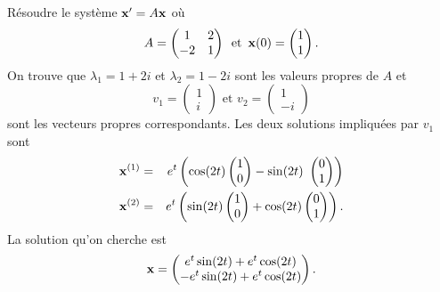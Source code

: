 \begin{example}
  \label{exe:21}
  Résoudre le système $\mathbf{x}' = A\mathbf{x}$ où 
  \begin{displaymath}
    A  =
    \begin{pmatrix}
      1 & 2 \\
      -2 & 1
    \end{pmatrix} \, \text{ et } \, \mathbf{x}(0) =
    \begin{pmatrix}
      1\\1
    \end{pmatrix}. 
  \end{displaymath}
 On trouve que $\lambda_1 = 1 + 2 i$ et $\lambda_2 = 1 - 2i$ sont les valeurs propres de $A$ et 
 \begin{displaymath}
   v_1 =
   \begin{pmatrix}
     1\\i
   \end{pmatrix} \text{ et } v_2 =
   \begin{pmatrix}
     1 \\ -i
   \end{pmatrix}
 \end{displaymath}
sont les vecteurs propres correspondants. 
Les deux solutions impliquées par $v_1$ sont 
\begin{eqnarray*}
  \mathbf{x}^{(1)} & = & e^{ t} \left(\cos ( 2t)
                 \begin{pmatrix}
                   1\\0
                 \end{pmatrix}
- \sin (2t)\
  \begin{pmatrix}
    0\\1
  \end{pmatrix}
\right) \\
  \mathbf{x}^{(2)} & = &  e^{t} \left(\sin ( 2t )
                 \begin{pmatrix}
                   1\\0
                 \end{pmatrix}
+ \cos(2t)
  \begin{pmatrix}
    0\\1
  \end{pmatrix}
\right). 
\end{eqnarray*} 
La solution qu'on cherche est 
\begin{displaymath}
  \mathbf{x} = \begin{pmatrix}
           e^{t} \sin (2t) + e^{t} \cos(2t) \\
           - e^{t} \sin(2t) + e^{t} \cos(2t)
         \end{pmatrix}.
\end{displaymath}

\end{example}






